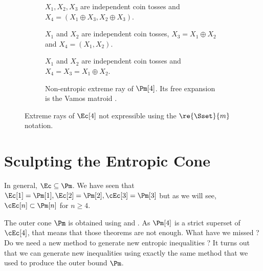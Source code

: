 \documentclass[11pt,twoside,a4paper,openright]{uclouvain-thesis}
\begin{document}
\begin{figure}
  \centering
  \begin{subfigure}[b]{0.45\textwidth}
    \centering
    \caption{$X_1,X_2,X_3$ are independent coin tosses and
    $X_4 = (X_1 \oplus X_3, X_2 \oplus X_3)$.}%
    \label{fig:g43}
  \end{subfigure}\hfill
  \begin{subfigure}[b]{0.45\textwidth}
    \centering
    \caption{$X_1$ and $X_2$ are independent coin tosses,
    \label{fig:g42}
    $X_3 = X_1 \oplus X_2$ and $X_4 = (X_1,X_2)$.}
  \end{subfigure}
  \begin{subfigure}[b]{0.49\textwidth}
    \centering
    \caption{$X_1$ and $X_2$ are independent coin tosses and
    $X_4 = X_3 = X_1 \oplus X_2$.}
  \end{subfigure}
  \begin{subfigure}[b]{0.49\textwidth}
    \centering
    \caption{
      Non-entropic extreme ray of $\Pm[4]$. Its free expansion is the Vamos matroid \cite{vamos1968representation}. %
    }
    \label{fig:f12}
  \end{subfigure}
  \caption{Extreme rays of $\Ec[4]$ not expressible using the $\re{\Sset}{m}$ notation.}
  \label{fig:extremerays4}
\end{figure}

\section{Sculpting the Entropic Cone}
\label{sec:nsi}
In general, $\Ec \subseteq \Pm$.
We have seen that $\Ec[1] = \Pm[1], \Ec[2] = \Pm[2], \cEc[3] = \Pm[3]$ but as we will see, $\cEc[n] \subset \Pm[n]$ for $n \geq 4$.

The outer cone $\Pm$ is obtained using  and .
As $\Pm[4]$ is a strict superset of $\cEc[4]$,
that means that those theorems are not enough.
What have we missed ?
Do we need a new method to generate new entropic inequalities ?
It turns out that we can generate new inequalities using exactly the same method that we used to produce the outer bound $\Pm$.

\label{sec:sculpting}
\end{document}
